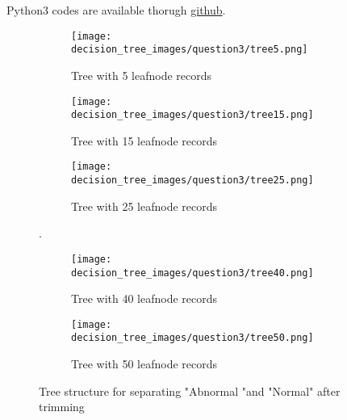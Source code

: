 \documentclass{article}
\begin{document}
Python3 codes are available thorugh \href{https://github.com/frankligy/exercise_codes/blob/master/decision_tree_copy3.py}{github}.

\begin{figure}[h]
    \centering
    \begin{subfigure}[h]{.45\linewidth}
    \texttt{[image: decision\_tree\_images/question3/tree5.png]}
    \caption{Tree with 5 leafnode records}
    \label{q3_tree5}
    \end{subfigure}
    
    \begin{subfigure}[h]{.45\linewidth}
    \texttt{[image: decision\_tree\_images/question3/tree15.png]}
    \caption{Tree with 15 leafnode records}
    \label{q3_tree15}
    \end{subfigure}
    \begin{subfigure}[h]{.45\linewidth}
    \texttt{[image: decision\_tree\_images/question3/tree25.png]}
    \caption{Tree with 25 leafnode records}
    \label{q3_tree25}
    \end{subfigure}. %
    
    \begin{subfigure}[h]{.45\linewidth}
    \texttt{[image: decision\_tree\_images/question3/tree40.png]}
    \caption{Tree with 40 leafnode records}
    \label{q3_tree40}
    \end{subfigure}
    \begin{subfigure}[h]{.45\linewidth}
    \texttt{[image: decision\_tree\_images/question3/tree50.png]}
    \caption{Tree with 50 leafnode records}
    \label{q3_tree50}
    \end{subfigure} 
    
    \caption{Tree structure for separating "Abnormal "and "Normal" after trimming}
    \label{fig5}
\end{figure}
\end{document}
